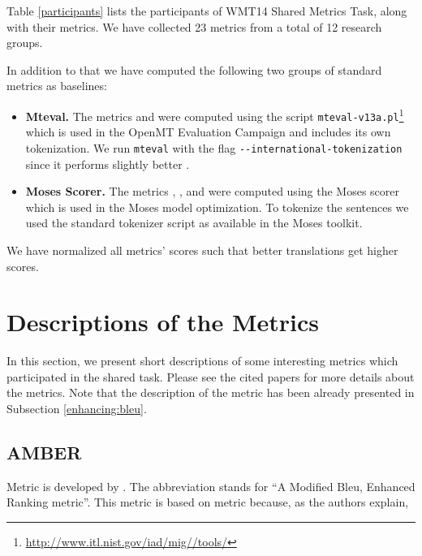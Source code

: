 Table \ref{participants} lists the participants of WMT14 Shared Metrics Task,
along with their metrics. We have collected 23 metrics from a total of
12 research groups.

In addition to that we have computed the following two groups of standard
metrics as baselines: 

\begin{itemize}

\item \textbf{Mteval.} The metrics   and
      were computed using the script
    \texttt{mteval-v13a.pl}\footnote{\url{http://www.itl.nist.gov/iad/mig//tools/}}
    which is used in the OpenMT Evaluation Campaign and includes its own
    tokenization.  We run \texttt{mteval} with the flag
    \texttt{-{}-international-tokenization} since it performs slightly better
    .

\item \textbf{Moses Scorer.} The metrics  ,
    ,  and  
    were computed using the Moses scorer which is used in the Moses model
    optimization. To tokenize the sentences we used the standard tokenizer
    script as available in the Moses toolkit.


\end{itemize}

We have normalized all metrics' scores such that better translations get higher scores. 

\section{Descriptions of the Metrics}
\label{section:metrics:description}

In this section, we present short descriptions of some interesting metrics which
participated in the shared task.  Please see the cited papers for more details
about the metrics. Note that the description of the  metric
has been already presented in Subsection \ref{enhancing:bleu}.

\subsection{AMBER}

Metric  is developed by . The abbreviation 
stands for ``A Modified Bleu, Enhanced Ranking metric''. This metric is based
on  metric because, as the authors explain, 

